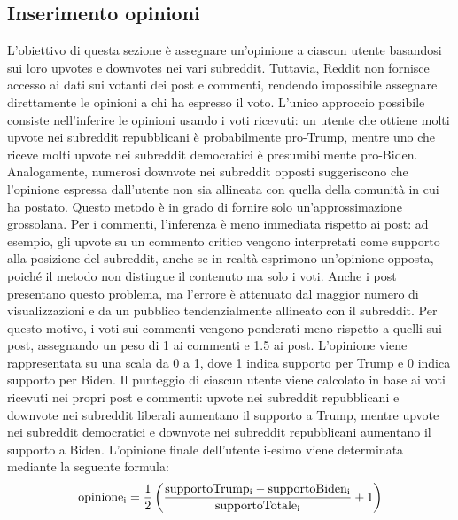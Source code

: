 \documentclass[sigchi]{acmart}
\begin{document}
\subsection{Inserimento opinioni} \label{sec:opinion}
L'obiettivo di questa sezione è assegnare un'opinione a ciascun utente basandosi sui loro upvotes e downvotes nei vari subreddit. Tuttavia, Reddit non fornisce accesso ai dati sui votanti dei post e commenti, rendendo impossibile assegnare direttamente le opinioni a chi ha espresso il voto. L'unico approccio possibile consiste nell'inferire le opinioni usando i voti ricevuti: un utente che ottiene molti upvote nei subreddit repubblicani è probabilmente pro-Trump, mentre uno che riceve molti upvote nei subreddit democratici è presumibilmente pro-Biden. Analogamente, numerosi downvote nei subreddit opposti suggeriscono che l'opinione espressa dall'utente non sia allineata con quella della comunità in cui ha postato.
Questo metodo è in grado di fornire solo un'approssimazione grossolana. Per i commenti, l'inferenza è meno immediata rispetto ai post: ad esempio, gli upvote su un commento critico vengono interpretati come supporto alla posizione del subreddit, anche se in realtà esprimono un'opinione opposta, poiché il metodo non distingue il contenuto ma solo i voti. Anche i post presentano questo problema, ma l'errore è attenuato dal maggior numero di visualizzazioni e da un pubblico tendenzialmente allineato con il subreddit. Per questo motivo, i voti sui commenti vengono ponderati meno rispetto a quelli sui post, assegnando un peso di 1 ai commenti e 1.5 ai post.
L'opinione viene rappresentata su una scala da 0 a 1, dove 1 indica supporto per Trump e 0 indica supporto per Biden. Il punteggio di ciascun utente viene calcolato in base ai voti ricevuti nei propri post e commenti: upvote nei subreddit repubblicani e downvote nei subreddit liberali aumentano il supporto a Trump, mentre upvote nei subreddit democratici e downvote nei subreddit repubblicani aumentano il supporto a Biden. L'opinione finale dell'utente i-esimo viene determinata mediante la seguente formula:
\begin{equation}
    \rm{opinione_i} = \frac{1}{2}  \left( \frac{\rm{supporto Trump_i} - \rm{supporto Biden_i}}{supporto  Totale_i} +1 \right)
\end{equation}
\end{document}
